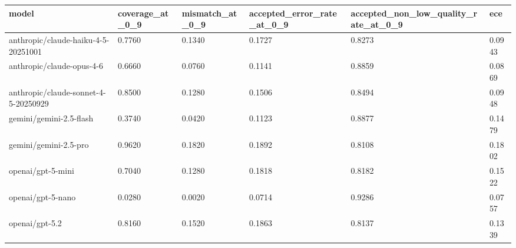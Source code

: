 \begin{tabular}{llllll}
\toprule
model & coverage_at_0_9 & mismatch_at_0_9 & accepted_error_rate_at_0_9 & accepted_non_low_quality_rate_at_0_9 & ece \\
\midrule
anthropic/claude-haiku-4-5-20251001 & 0.7760 & 0.1340 & 0.1727 & 0.8273 & 0.0943 \\
anthropic/claude-opus-4-6 & 0.6660 & 0.0760 & 0.1141 & 0.8859 & 0.0869 \\
anthropic/claude-sonnet-4-5-20250929 & 0.8500 & 0.1280 & 0.1506 & 0.8494 & 0.0948 \\
gemini/gemini-2.5-flash & 0.3740 & 0.0420 & 0.1123 & 0.8877 & 0.1479 \\
gemini/gemini-2.5-pro & 0.9620 & 0.1820 & 0.1892 & 0.8108 & 0.1802 \\
openai/gpt-5-mini & 0.7040 & 0.1280 & 0.1818 & 0.8182 & 0.1522 \\
openai/gpt-5-nano & 0.0280 & 0.0020 & 0.0714 & 0.9286 & 0.0757 \\
openai/gpt-5.2 & 0.8160 & 0.1520 & 0.1863 & 0.8137 & 0.1339 \\
\bottomrule
\end{tabular}
